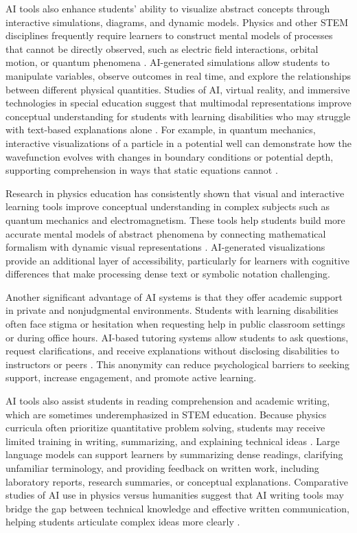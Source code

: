 \documentclass[]{aastex701}
\begin{document}
AI tools also enhance students' ability to visualize abstract concepts through interactive simulations, diagrams, and dynamic models. Physics and other STEM disciplines frequently require learners to construct mental models of processes that cannot be directly observed, such as electric field interactions, orbital motion, or quantum phenomena \autocite{Finkelstein2005}. AI-generated simulations allow students to manipulate variables, observe outcomes in real time, and explore the relationships between different physical quantities. Studies of AI, virtual reality, and immersive technologies in special education suggest that multimodal representations improve conceptual understanding for students with learning disabilities who may struggle with text-based explanations alone \autocite{Voultsiou2025, HarkinsBrown2025}. For example, in quantum mechanics, interactive visualizations of a particle in a potential well can demonstrate how the wavefunction evolves with changes in boundary conditions or potential depth, supporting comprehension in ways that static equations cannot \autocite{Finkelstein2005}.

Research in physics education has consistently shown that visual and interactive learning tools improve conceptual understanding in complex subjects such as quantum mechanics and electromagnetism. These tools help students build more accurate mental models of abstract phenomena by connecting mathematical formalism with dynamic visual representations \autocite{Finkelstein2005}. AI-generated visualizations provide an additional layer of accessibility, particularly for learners with cognitive differences that make processing dense text or symbolic notation challenging.

Another significant advantage of AI systems is that they offer academic support in private and nonjudgmental environments. Students with learning disabilities often face stigma or hesitation when requesting help in public classroom settings or during office hours. AI-based tutoring systems allow students to ask questions, request clarifications, and receive explanations without disclosing disabilities to instructors or peers \autocite{Khowaja2025}. This anonymity can reduce psychological barriers to seeking support, increase engagement, and promote active learning.

AI tools also assist students in reading comprehension and academic writing, which are sometimes underemphasized in STEM education. Because physics curricula often prioritize quantitative problem solving, students may receive limited training in writing, summarizing, and explaining technical ideas \autocite{Alenezi2025}. Large language models can support learners by summarizing dense readings, clarifying unfamiliar terminology, and providing feedback on written work, including laboratory reports, research summaries, or conceptual explanations. Comparative studies of AI use in physics versus humanities suggest that AI writing tools may bridge the gap between technical knowledge and effective written communication, helping students articulate complex ideas more clearly \autocite{Alenezi2025}.
\end{document}
